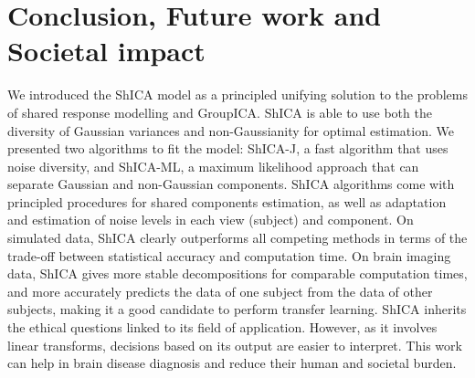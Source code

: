 
\section{Conclusion, Future work and Societal impact}
We introduced the ShICA model as a principled unifying solution to the problems of shared response modelling and GroupICA. ShICA is able to use both the diversity of Gaussian variances and non-Gaussianity for optimal estimation. We presented two algorithms to fit the model: ShICA-J, a fast algorithm that uses noise diversity, and ShICA-ML, a maximum likelihood approach that can separate Gaussian and non-Gaussian components. ShICA algorithms come with principled procedures for shared components estimation, as well as adaptation and estimation of noise levels in each view (subject) and component. On simulated data, ShICA clearly outperforms all competing methods in terms of the trade-off between statistical accuracy and computation time. On brain imaging data, ShICA gives more stable decompositions for comparable computation times, and more accurately predicts the data of one subject from the data of other subjects, making it a good candidate to perform transfer learning. ShICA inherits the ethical questions linked to its field of application. However, as it involves linear transforms, decisions based on its output are easier to interpret. This work can help in brain disease diagnosis and reduce their human and societal burden.


